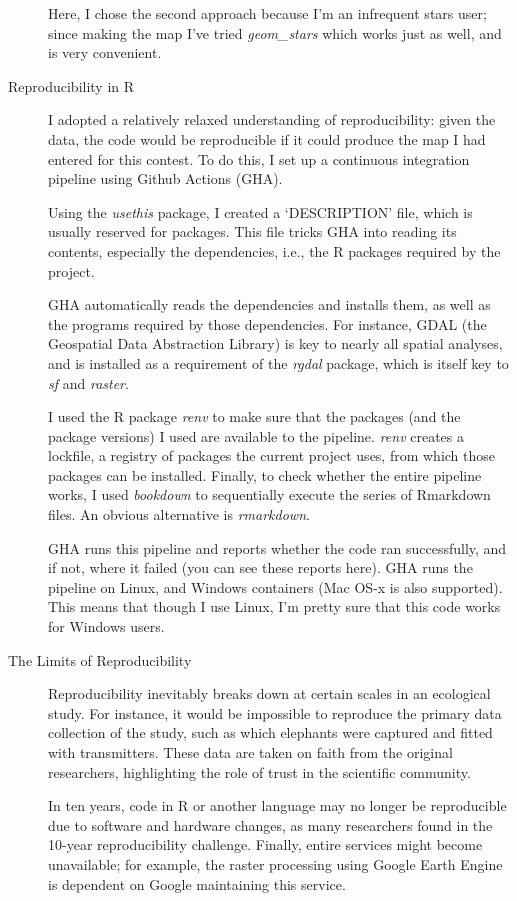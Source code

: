 \begin{description}
			Here, I chose the second approach because I'm an infrequent stars user; since making the map I've tried \textit{geom\_stars} which works just as well, and is very convenient.

			\item[Reproducibility in R] I adopted a relatively relaxed understanding of reproducibility: given the data, the code would be reproducible if it could produce the map I had entered for this contest. To do this, I set up a continuous integration pipeline using Github Actions (GHA).

			Using the \textit{usethis} package, I created a `DESCRIPTION' file, which is usually reserved for packages. This file tricks GHA into reading its contents, especially the dependencies, i.e., the R packages required by the project.
	
			GHA automatically reads the dependencies and installs them, as well as the programs required by those dependencies. For instance, GDAL (the Geospatial Data Abstraction Library) is key to nearly all spatial analyses, and is installed as a requirement of the \textit{rgdal} package, which is itself key to \textit{sf} and \textit{raster}.
	
			I used the R package \textit{renv} to make sure that the packages (and the package versions) I used are available to the pipeline. \textit{renv} creates a lockfile, a registry of packages the current project uses, from which those packages can be installed.
			Finally, to check whether the entire pipeline works, I used \textit{bookdown} to sequentially execute the series of Rmarkdown files. An obvious alternative is \textit{rmarkdown}.
	
			GHA runs this pipeline and reports whether the code ran successfully, and if not, where it failed (you can see these reports here). GHA runs the pipeline on Linux, and Windows containers (Mac OS-x is also supported). This means that though I use Linux, I'm pretty sure that this code works for Windows users.

			\item[The Limits of Reproducibility] Reproducibility inevitably breaks down at certain scales in an ecological study. For instance, it would be impossible to reproduce the primary data collection of the study, such as which elephants were captured and fitted with transmitters. These data are taken on faith from the original researchers, highlighting the role of trust in the scientific community.

			In ten years, code in R or another language may no longer be reproducible due to software and hardware changes, as many researchers found in the 10-year reproducibility challenge. Finally, entire services might become unavailable; for example, the raster processing using Google Earth Engine is dependent on Google maintaining this service.
	

\end{description}
